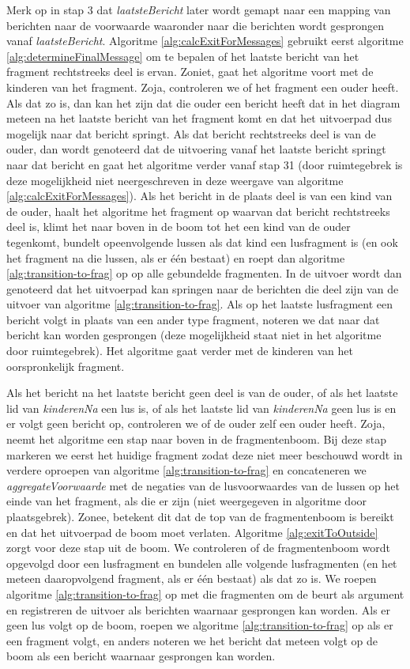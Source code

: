 Merk op in stap 3 dat \textit{laatsteBericht} later wordt gemapt naar een mapping van berichten naar de voorwaarde waaronder naar die berichten wordt gesprongen vanaf \textit{laatsteBericht}.
Algoritme \ref{alg:calcExitForMessages} gebruikt eerst algoritme \ref{alg:determineFinalMessage} om te bepalen of het laatste bericht van het fragment rechtstreeks deel is ervan. Zoniet, gaat het algoritme voort met de kinderen van het fragment. Zoja, controleren we of het fragment een ouder heeft. Als dat zo is, dan kan het zijn dat die ouder een bericht heeft dat in het diagram meteen na het laatste bericht van het fragment komt en dat het uitvoerpad dus mogelijk naar dat bericht springt. Als dat bericht rechtstreeks deel is van de ouder, dan wordt genoteerd dat de uitvoering vanaf het laatste bericht springt naar dat bericht en gaat het algoritme verder vanaf stap 31 (door ruimtegebrek is deze mogelijkheid niet neergeschreven in deze weergave van algoritme \ref{alg:calcExitForMessages}). Als het bericht in de plaats deel is van een kind van de ouder, haalt het algoritme het fragment op waarvan dat bericht rechtstreeks deel is, klimt het naar boven in de boom tot het een kind van de ouder tegenkomt, bundelt opeenvolgende lussen als dat kind een lusfragment is (en ook het fragment na die lussen, als er \'e\'en bestaat) en roept dan algoritme \ref{alg:transition-to-frag} op op alle gebundelde fragmenten. In de uitvoer wordt dan genoteerd dat het uitvoerpad kan springen naar de berichten die deel zijn van de uitvoer van algoritme \ref{alg:transition-to-frag}. Als op het laatste lusfragment een bericht volgt in plaats van een ander type fragment, noteren we dat naar dat bericht kan worden gesprongen (deze mogelijkheid staat niet in het algoritme door ruimtegebrek). Het algoritme gaat verder met de kinderen van het oorspronkelijk fragment.

Als het bericht na het laatste bericht geen deel is van de ouder, of als het laatste lid van \textit{kinderenNa} een lus is, of als het laatste lid van \textit{kinderenNa} geen lus is en er volgt geen bericht op, controleren we of de ouder zelf een ouder heeft. Zoja, neemt het algoritme een stap naar boven in de fragmentenboom. Bij deze stap markeren we eerst het huidige fragment zodat deze niet meer beschouwd wordt in verdere oproepen van algoritme \ref{alg:transition-to-frag} en concateneren we \textit{aggregateVoorwaarde} met de negaties van de lusvoorwaardes van de lussen op het einde van het fragment, als die er zijn (niet weergegeven in algoritme door plaatsgebrek). Zonee, betekent dit dat de top van de fragmentenboom is bereikt en dat het uitvoerpad de boom moet verlaten. Algoritme \ref{alg:exitToOutside} zorgt voor deze stap uit de boom. We controleren of de fragmentenboom wordt opgevolgd door een lusfragment en bundelen alle volgende lusfragmenten (en het meteen daaropvolgend fragment, als er \'e\'en bestaat) als dat zo is. We roepen algoritme \ref{alg:transition-to-frag} op met die fragmenten om de beurt als argument en registreren de uitvoer als berichten waarnaar gesprongen kan worden. Als er geen lus volgt op de boom, roepen we algoritme \ref{alg:transition-to-frag} op als er een fragment volgt, en anders noteren we het bericht dat meteen volgt op de boom als een bericht waarnaar gesprongen kan worden.

